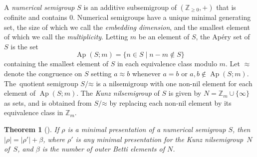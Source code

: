 \documentclass[10pt,a4paper]{amsart}
\newcommand\ZZ{\mathbb{Z}}
\newcommand\app{\mathord\approx}
\DeclareMathOperator\Ap{Ap}
\newtheorem{thm}{Theorem}[section]
\theoremstyle{definition}\newtheorem{defi}[thm]{Definition}
\begin{document}
A \emph{numerical semigroup} $S$ is an additive subsemigroup of $(\ZZ_{\geq 0}, +)$ that is cofinite and contains $0$.  Numerical semigroups have a unique minimal generating set, the size of which we call the \emph{embedding dimension}, and the smallest element of which we call the \emph{multiplicity}. Letting $m$ be an element of $S$, the Ap\'ery set of $S$ is the set 
\[
\Ap(S;m) = \{n \in S \mid n - m \notin S\}
\]
containing the smallest element of $S$ in each equivalence class modulo $m$.  
Let $\approx$ denote the congruence on $S$ setting $a \approx b$ whenever $a = b$ or $a,b \notin \Ap(S;m)$.  The~quotient semigroup $S/\app$ is a nilsemigroup with one non-nil element for each element of $\Ap(S;m)$.  The \emph{Kunz nilsemigroup} of $S$ is given by $N = \ZZ_m \cup \{\infty\}$ as sets, and is obtained from $S/\app$ by replacing each non-nil element by its equivalence class in $\ZZ_m$.  

\begin{thm}[{\cite{kunzfaces3}}]\label{t:minprescard}
If $\rho$ is a minimal presentation of a numerical semigroup $S$, then~$|\rho| = |\rho'| + \beta$, where $\rho'$ is any minimal presentation for the Kunz nilsemigroup~$N$ of~$S$, and $\beta$ is the number of outer Betti elements of $N$.  
\end{thm}
\end{document}
